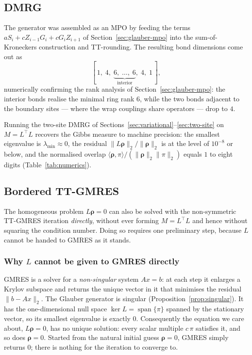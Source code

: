 \documentclass[12pt]{article}
\newcommand{\brho}{\boldsymbol{\rho}}
\theoremstyle{definition}
\theoremstyle{remark}
\begin{document}
\subsection{DMRG}

The generator was assembled as an MPO by feeding the terms $a S_i + c Z_{i-1} G_i + c G_i Z_{i+1}$ of Section~\ref{sec:glauber-mpo} into the sum-of-Kroneckers construction and TT-rounding. The resulting bond dimensions come out as
\[
[\,1,\; 4,\; \underbrace{6,\; \dots,\; 6}_{\text{interior}},\; 4,\; 1\,],
\]
numerically confirming the rank analysis of Section~\ref{sec:glauber-mpo}: the interior bonds realise the minimal ring rank $6$, while the two bonds adjacent to the boundary sites --- where the wrap couplings share operators --- drop to $4$.

Running the two-site DMRG of Sections~\ref{sec:variational}--\ref{sec:two-site} on $M = L^\top L$ recovers the Gibbs measure to machine precision: the smallest eigenvalue is $\lambda_{\min} \approx 0$, the residual $\|L\brho\|_2 / \|\brho\|_2$ is at the level of $10^{-8}$ or below, and the normalised overlap $\langle \brho, \pi\rangle / (\|\brho\|_2\|\pi\|_2)$ equals $1$ to eight digits (Table~\ref{tab:numerics}).

\subsection{Bordered TT-GMRES}\label{sec:tt-gmres}

The homogeneous problem $L\brho = 0$ can also be solved with the non-symmetric TT-GMRES iteration \emph{directly}, without ever forming $M = L^\top L$ and hence without squaring the condition number. Doing so requires one preliminary step, because $L$ cannot be handed to GMRES as it stands.

\subsubsection*{Why $L$ cannot be given to GMRES directly}

GMRES is a solver for a \emph{non-singular} system $Ax = b$: at each step it enlarges a Krylov subspace and returns the unique vector in it that minimises the residual $\|b - Ax\|_2$. The Glauber generator is singular (Proposition~\ref{prop:singular}). It has the one-dimensional null space $\ker L = \operatorname{span}\{\pi\}$ spanned by the stationary vector, so its smallest eigenvalue is exactly $0$. Consequently the equation we care about, $L\brho = 0$, has no unique solution: every scalar multiple $c\,\pi$ satisfies it, and so does $\brho = 0$. Started from the natural initial guess $\brho = 0$, GMRES simply returns $0$; there is nothing for the iteration to converge to.
\end{document}

